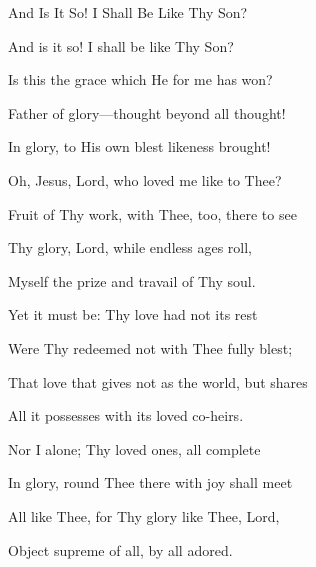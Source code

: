 \documentclass[12pt]{book}
\begin{document}
\begin{song}{And Is It So! I Shall Be Like Thy Son?}{}
  {\SBPubDom}
  {}
  {}
  {}

  \begin{SBVerse}
    And is it so! I shall be like Thy Son?

    Is this the grace which He for me has won?

    Father of glory---thought beyond all thought!

    In glory, to His own blest likeness brought!
  \end{SBVerse}

  \begin{SBVerse}
    Oh, Jesus, Lord, who loved me like to Thee?

    Fruit of Thy work, with Thee, too, there to see

    Thy glory, Lord, while endless ages roll,

    Myself the prize and travail of Thy soul.
  \end{SBVerse}

  \begin{SBVerse}
    Yet it must be: Thy love had not its rest

    Were Thy redeemed not with Thee fully blest;

    That love that gives not as the world, but shares

    All it possesses with its loved co-heirs.
  \end{SBVerse}

  \begin{SBVerse}
    Nor I alone; Thy loved ones, all complete

    In glory, round Thee there with joy shall meet

    All like Thee, for Thy glory like Thee, Lord,

    Object supreme of all, by all adored.
  \end{SBVerse}
\end{song}
\end{document}
